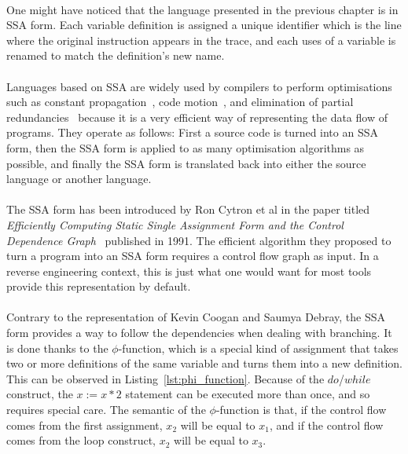 \paragraph{}
One might have noticed that the language presented in the previous chapter is in SSA form. Each variable definition is assigned a unique identifier which is the line where the original instruction appears in the trace, and each uses of a variable is renamed to match the definition's new name. 

\paragraph{}
Languages based on SSA are widely used by compilers to perform optimisations such as constant propagation~\cite{wegman1991constant}, code motion~\cite{click1995global}, and elimination of partial redundancies~\cite{briggs1994effective} because it is a very efficient way of representing the data flow of programs. They operate as follows: First a source code is turned into an SSA form, then the SSA form is applied to as many optimisation algorithms as possible, and finally the SSA form is translated back into either the source language or another language.

\paragraph{}
The SSA form has been introduced by Ron Cytron et al in the paper titled \textit{Efficiently Computing Static Single Assignment Form and the Control Dependence Graph}~\cite{cytron1991efficiently} published in 1991. The efficient algorithm they proposed to turn a program into an SSA form requires a control flow graph as input. In a reverse engineering context, this is just what one would want for most tools provide this representation by default. 

\paragraph{}
Contrary to the representation of Kevin Coogan and Saumya Debray, the SSA form provides a way to follow the dependencies when dealing with branching. It is done thanks to the $\phi$-function, which is a special kind of assignment that takes two or more definitions of the same variable and turns them into a new definition. This can be observed in Listing~\ref{lst:phi_function}. Because of the $do$/$while$ construct, the $x:=x*2$ statement can be executed more than once, and so requires special care. The semantic of the $\phi$-function is that, if the control flow comes from the first assignment, $x_2$ will be equal to $x_1$, and if the control flow comes from the loop construct, $x_2$ will be equal to $x_3$. \\ \\

